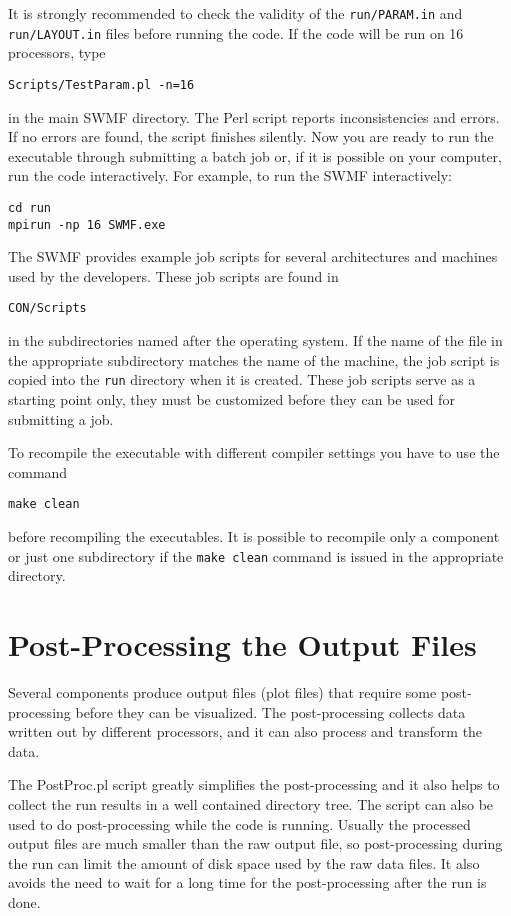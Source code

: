It is strongly recommended to check the validity of the {\tt run/PARAM.in} and 
{\tt run/LAYOUT.in} files before running the code. If the
code will be run on 16 processors, type
\begin{verbatim}
Scripts/TestParam.pl -n=16
\end{verbatim}
in the main SWMF directory.
The Perl script reports inconsistencies and errors. 
If no errors are found, the script finishes silently.
Now you are ready to run the executable through submitting a batch job or, 
if it is possible on your computer, run the code interactively.  For
example, to run the SWMF interactively:
\begin{verbatim}
cd run
mpirun -np 16 SWMF.exe
\end{verbatim}
The SWMF provides example job scripts for several architectures and
machines used by the developers. These job scripts are found in 
\begin{verbatim}
CON/Scripts
\end{verbatim}
in the subdirectories named after the operating system. If the name
of the file in the appropriate subdirectory matches the 
name of the machine, the job script is copied into
the {\tt run} directory when it is created.
These job scripts serve as a starting point only, they must
be customized before they can be used for submitting a job.

To recompile the executable with different compiler settings you have
to use the command
\begin{verbatim}
make clean
\end{verbatim}
before recompiling the executables. It is possible to recompile
only a component or just one subdirectory if the {\tt make clean}
command is issued in the appropriate directory.

\section{Post-Processing the Output Files}

Several components produce output files (plot files) that require
some post-processing before they can be visualized. The post-processing
collects data written out by different processors, and it can also
process and transform the data. 

The PostProc.pl script greatly simplifies the post-processing and
it also helps to collect the run results in a well contained directory tree.
The script can also be used to do post-processing while the code is running.
Usually the processed output files are much smaller than the raw output file,
so post-processing during the run can limit the amount of disk space used
by the raw data files. It also avoids the need to wait for a long time 
for the post-processing after the run is done. 

